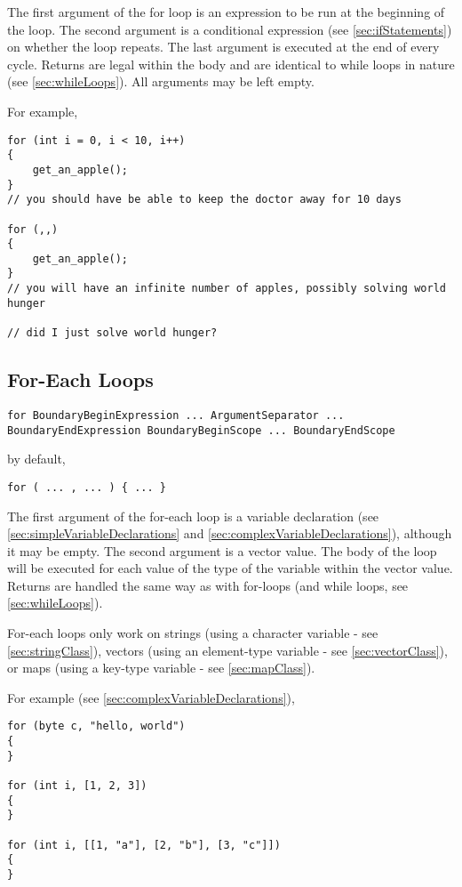 \documentclass[10pt,a4paper]{article}
\begin{document}
The first argument of the for loop is an expression to be run at the beginning of the loop. The second argument is a conditional expression (see \ref{sec:ifStatements}) on whether the loop repeats. The last argument is executed at the end of every cycle. Returns are legal within the body and are identical to while loops in nature (see \ref{sec:whileLoops}). All arguments may be left empty.

For example,
\begin{verbatim}
for (int i = 0, i < 10, i++)
{
    get_an_apple();
}
// you should have be able to keep the doctor away for 10 days

for (,,)
{
	get_an_apple();
}
// you will have an infinite number of apples, possibly solving world hunger

// did I just solve world hunger?
\end{verbatim}

\subsection{For-Each Loops}
\begin{verbatim}
for BoundaryBeginExpression ... ArgumentSeparator ... BoundaryEndExpression BoundaryBeginScope ... BoundaryEndScope
\end{verbatim}

by default,
\begin{verbatim}
for ( ... , ... ) { ... }
\end{verbatim}

The first argument of the for-each loop is a variable declaration (see \ref{sec:simpleVariableDeclarations} and \ref{sec:complexVariableDeclarations}), although it may be empty. The second argument is a vector value. The body of the loop will be executed for each value of the type of the variable within the vector value. Returns are handled the same way as with for-loops (and while loops, see \ref{sec:whileLoops}).

For-each loops only work on strings (using a character variable - see \ref{sec:stringClass}), vectors (using an element-type variable - see \ref{sec:vectorClass}), or maps (using a key-type variable - see \ref{sec:mapClass}).

For example (see \ref{sec:complexVariableDeclarations}),
\begin{verbatim}
for (byte c, "hello, world")
{
}

for (int i, [1, 2, 3])
{
}

for (int i, [[1, "a"], [2, "b"], [3, "c"]])
{
}
\end{verbatim}
\end{document}
